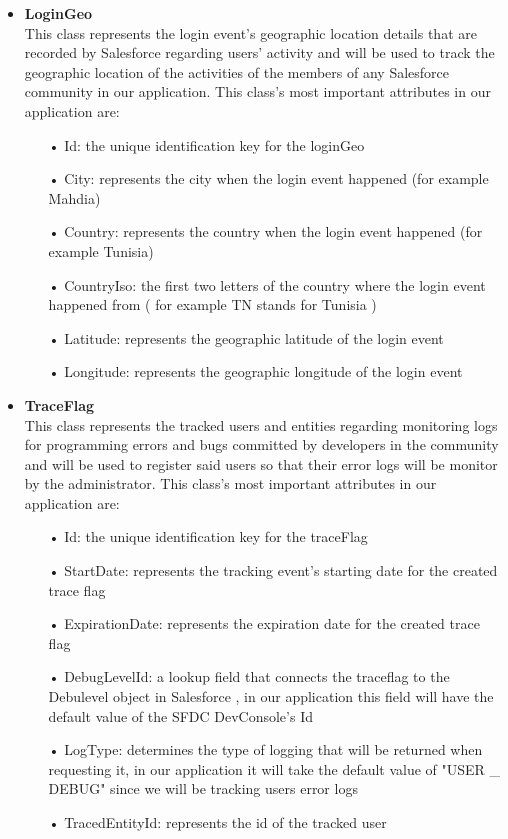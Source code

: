 \begin{itemize}
\begin{itemize}
\end{itemize}
\item \textbf{LoginGeo}\\
This class represents the login event's geographic location details that are recorded by Salesforce regarding users' activity and will be used to track the geographic location of the activities of the members of any Salesforce community in our application. This class's most important attributes in our application are:
\begin{itemize}
\item[•] Id: the unique identification key for the loginGeo
\item[•] City: represents the city when the login event happened (for example Mahdia)
\item[•] Country: represents the country when the login event happened (for example Tunisia)
\item[•] CountryIso: the first two letters of the country where the login event happened from ( for example TN stands for Tunisia )
\item[•] Latitude: represents the geographic latitude of the login event
\item[•] Longitude: represents the geographic longitude of the login event

\end{itemize}
\item \textbf{TraceFlag}\\
This class represents the tracked users and entities regarding monitoring logs for programming errors and bugs committed by developers in the community and will be used to register said users so that their error logs will be monitor by the administrator. This class's most important attributes in our application are:
\begin{itemize}
\item[•] Id: the unique identification key for the traceFlag
\item[•] StartDate: represents the tracking event's starting date for the created trace flag
\item[•] ExpirationDate: represents the expiration date for the created trace flag
\item[•] DebugLevelId: a lookup field that connects the traceflag to the Debulevel object in Salesforce , in our application this field will have the default value of the SFDC DevConsole's Id 
\item[•] LogType: determines the type of logging that will be returned when requesting it, in our application it will take the default value of "USER \_ DEBUG" since we will be tracking users error logs
\item[•] TracedEntityId: represents the id of the tracked user


\end{itemize}
\end{itemize}
